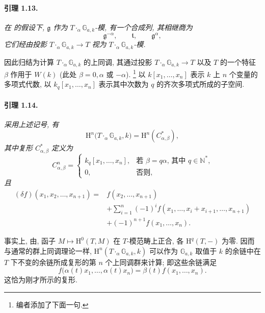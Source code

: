 \paragraph{\textbf{引理 1.13.}}
\emph{在  的假设下, \(\mathfrak g\) 作为 \(T\mathbin{\cdot_\alpha}\mathbb G_{a,k}\)-模, 有一个合成列, 其相继商为}
\[
  \mathfrak g^{-\alpha},\qquad \mathfrak t,\qquad
  \mathfrak g^\alpha,
\]
\emph{它们经由投影 \(T\mathbin{\cdot_\alpha}\mathbb G_{a,k}\to T\) 视为 \(T\mathbin{\cdot_\alpha}\mathbb G_{a,k}\)-模.}

因此归结为计算 \(T\mathbin{\cdot_\alpha}\mathbb G_{a,k}\) 的上同调, 其通过投影 \(T\mathbin{\cdot_\alpha}\mathbb G_{a,k}\to T\) 以及 \(T\) 的一个特征 \(\beta\) 作用于 \(W(k)\) (此处 \(\beta=0,\alpha\) 或 \(-\alpha\)).
\footnote{编者添加了下面一句.}
以 \(k[x_1,\ldots,x_n]\) 表示 \(k\) 上 \(n\) 个变量的多项式代数, 以 \(k_q[x_1,\ldots,x_n]\) 表示其中次数为 \(q\) 的齐次多项式所成的子空间.

\paragraph{\textbf{引理 1.14.}}
\emph{采用上述记号, 有}
\[
  \mathrm H^n\bigl(T\mathbin{\cdot_\alpha}\mathbb G_{a,k},k\bigr)
    =\mathrm H^n(C^\ast_{\alpha,\beta}),
\]
\emph{其中复形 \(C^\ast_{\alpha,\beta}\) 定义为}
\[
  C^n_{\alpha,\beta}=
  \begin{cases}
    k_q[x_1,\ldots,x_n],
      &\text{若 \(\beta=q\alpha\), 其中 \(q\in\mathbb N^\ast\),}\\
    0,&\text{否则,}
  \end{cases}
\]
\emph{且}
\[
\begin{aligned}
(\delta f)(x_1,x_2,\ldots,x_{n+1})
  ={}&f(x_2,\ldots,x_{n+1})\\
   &+\sum_{i=1}^{n}(-1)^i
       f(x_1,\ldots,x_i+x_{i+1},\ldots,x_{n+1})\\
   &+(-1)^{n+1}f(x_1,\ldots,x_n).
\end{aligned}
\]

事实上, 由, 函子 \(M\mapsto\mathrm H^0(T,M)\) 在 \(T\)-模范畴上正合, 各 \(\mathrm H^q(T,-)\) 为零. 因而与通常的群上同调理论一样, \(\mathrm H^n(T\mathbin{\cdot_\alpha}\mathbb G_{a,k},k)\) 可以作为 \(\mathbb G_{a,k}\) 取值于 \(k\) 的余链中在 \(T\) 下不变的余链所成复形的第 \(n\) 个上同调群来计算; 即这些余链满足
\[
  f\bigl(\alpha(t)x_1,\ldots,\alpha(t)x_n\bigr)
    =\beta(t)f(x_1,\ldots,x_n).
\]
这恰为刚才所示的复形.


